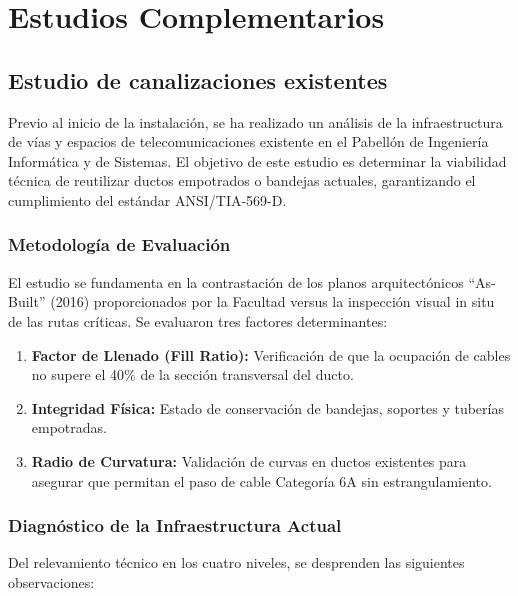 \chapter{Estudios Complementarios}

\section{Estudio de canalizaciones existentes}

Previo al inicio de la instalación, se ha realizado un análisis de la infraestructura de vías y espacios de telecomunicaciones existente en el Pabellón de Ingeniería Informática y de Sistemas. El objetivo de este estudio es determinar la viabilidad técnica de reutilizar ductos empotrados o bandejas actuales, garantizando el cumplimiento del estándar ANSI/TIA-569-D.

\subsection*{Metodología de Evaluación}

El estudio se fundamenta en la contrastación de los planos arquitectónicos ``As-Built'' (2016) proporcionados por la Facultad versus la inspección visual in situ de las rutas críticas. Se evaluaron tres factores determinantes:

\begin{enumerate}
    \item \textbf{Factor de Llenado (Fill Ratio):} Verificación de que la ocupación de cables no supere el 40\% de la sección transversal del ducto.
    \item \textbf{Integridad Física:} Estado de conservación de bandejas, soportes y tuberías empotradas.
    \item \textbf{Radio de Curvatura:} Validación de curvas en ductos existentes para asegurar que permitan el paso de cable Categoría 6A sin estrangulamiento.
\end{enumerate}

\subsection*{Diagnóstico de la Infraestructura Actual}

Del relevamiento técnico en los cuatro niveles, se desprenden las siguientes observaciones:

